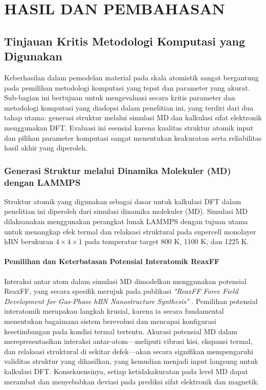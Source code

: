 \renewcommand{\thechapter}{\Roman{chapter}}
\chapter{HASIL DAN PEMBAHASAN}
\renewcommand{\thechapter}{\arabic{chapter}}

\section{Tinjauan Kritis Metodologi Komputasi yang Digunakan}
\label{sec:metodologi_kritis}
Keberhasilan dalam pemodelan material pada skala atomistik sangat bergantung pada pemilihan metodologi komputasi yang tepat dan parameter yang akurat. Sub-bagian ini bertujuan untuk mengevaluasi secara kritis parameter dan metodologi komputasi yang diadopsi dalam penelitian ini, yang terdiri dari dua tahap utama: generasi struktur melalui simulasi MD dan kalkulasi sifat elektronik menggunakan DFT. Evaluasi ini esensial karena kualitas struktur atomik input dan pilihan parameter komputasi sangat menentukan keakuratan serta reliabilitas hasil akhir yang diperoleh.

\subsection{Generasi Struktur melalui Dinamika Molekuler (MD) dengan LAMMPS}
\label{subsec:md_lammps}
Struktur atomik yang digunakan sebagai dasar untuk kalkulasi DFT dalam penelitian ini diperoleh dari simulasi dinamika molekuler (MD). Simulasi MD dilaksanakan menggunakan perangkat lunak LAMMPS \citep{Plimpton1995} dengan tujuan utama untuk menangkap efek termal dan relaksasi struktural pada supercell monolayer hBN berukuran $4 \times 4 \times 1$ pada temperatur target 800 K, 1100 K, dan 1225 K.

\subsubsection{Pemilihan dan Keterbatasan Potensial Interatomik ReaxFF}
Interaksi antar atom dalam simulasi MD dimodelkan menggunakan potensial ReaxFF, yang secara spesifik merujuk pada publikasi \emph{"ReaxFF Force Field Development for Gas-Phase hBN Nanostructure Synthesis"} \citep{Lele2022}. Pemilihan potensial interatomik merupakan langkah krusial, karena ia secara fundamental menentukan bagaimana sistem berevolusi dan mencapai konfigurasi kesetimbangan pada kondisi termal tertentu. Akurasi potensial MD dalam merepresentasikan interaksi antar-atom—meliputi vibrasi kisi, ekspansi termal, dan relaksasi struktural di sekitar defek—akan secara signifikan mempengaruhi validitas struktur yang dihasilkan, yang kemudian menjadi input langsung untuk kalkulasi DFT. Konsekuensinya, setiap ketidakakuratan pada level MD dapat merambat dan menyebabkan deviasi pada prediksi sifat elektronik dan magnetik.

